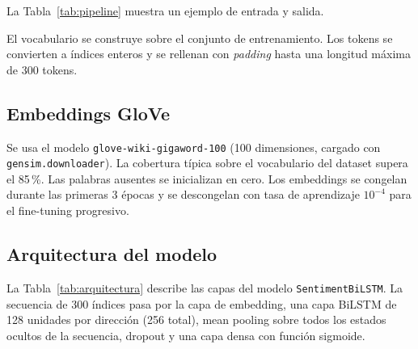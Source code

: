 \documentclass[letterpaper, 10 pt, conference]{ieeeconf}
\begin{document}
La Tabla~\ref{tab:pipeline} muestra un ejemplo de entrada y salida.

\begin{table}[h]
\centering
\caption{Ejemplo de preprocesamiento.}
\label{tab:pipeline}
\end{table}

El vocabulario se construye sobre el conjunto de entrenamiento. Los tokens se
convierten a \'indices enteros y se rellenan con \textit{padding} hasta una
longitud m\'axima de 300 tokens.

\subsection{Embeddings GloVe}

Se usa el modelo \texttt{glove-wiki-gigaword-100} (100 dimensiones, cargado
con \texttt{gensim.downloader}). La cobertura t\'ipica sobre el vocabulario
del dataset supera el 85\,\%. Las palabras ausentes se inicializan en cero.
Los embeddings se congelan durante las primeras 3 \'epocas y se descongelan
con tasa de aprendizaje $10^{-4}$ para el fine-tuning progresivo.

\subsection{Arquitectura del modelo}

La Tabla~\ref{tab:arquitectura} describe las capas del modelo
\texttt{SentimentBiLSTM}. La secuencia de 300 \'indices pasa por la capa de
embedding, una capa BiLSTM de 128 unidades por direcci\'on (256 total), mean
pooling sobre todos los estados ocultos de la secuencia, dropout y una capa
densa con funci\'on sigmoide.
\end{document}
